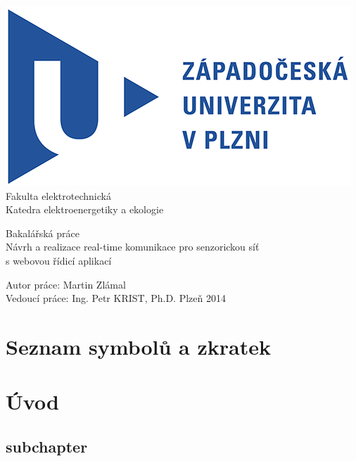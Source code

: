 \documentclass[oneside,12pt,a4paper]{book} %
\begin{document}
\pagestyle{empty}
\begin{titlepage}
\noindent
\includegraphics[scale=1]{zcu.png} \\[0.3cm]
Fakulta elektrotechnická \\
Katedra elektroenergetiky a ekologie
\vspace{5cm}
\begin{center}
	{\Huge\sc Bakalářská práce} \\
	\vspace{1cm}
	{\large Návrh a realizace real-time komunikace pro senzorickou síť\\s webovou řídicí aplikací}
\end{center}
\vfill
Autor práce: Martin Zlámal\\
Vedoucí práce: Ing. Petr KRIST, Ph.D. \hfill Plzeň 2014
\end{titlepage}






\tableofcontents
\cleardoublepage
{}
\listoffigures
\cleardoublepage
{}
\listoftables
\chapter*{Seznam symbolů a zkratek}

\chapter{Úvod}
\section{subchapter}
\end{document}
